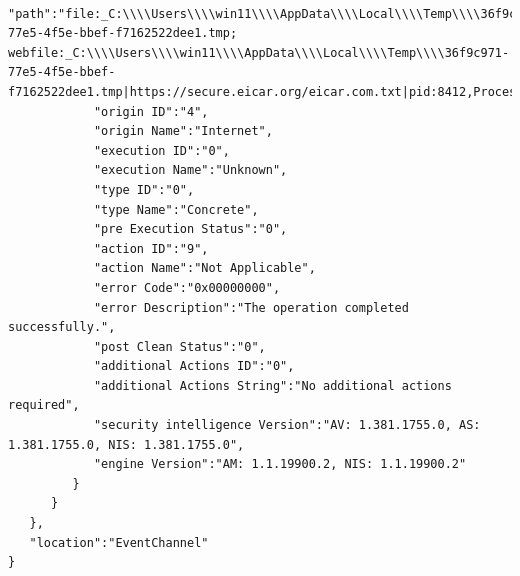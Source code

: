\begin{itemize}
\begin{verbatim}
            "path":"file:_C:\\\\Users\\\\win11\\\\AppData\\\\Local\\\\Temp\\\\36f9c971-77e5-4f5e-bbef-f7162522dee1.tmp; webfile:_C:\\\\Users\\\\win11\\\\AppData\\\\Local\\\\Temp\\\\36f9c971-77e5-4f5e-bbef-f7162522dee1.tmp|https://secure.eicar.org/eicar.com.txt|pid:8412,ProcessStart:133173854939240064",
            "origin ID":"4",
            "origin Name":"Internet",
            "execution ID":"0",
            "execution Name":"Unknown",
            "type ID":"0",
            "type Name":"Concrete",
            "pre Execution Status":"0",
            "action ID":"9",
            "action Name":"Not Applicable",
            "error Code":"0x00000000",
            "error Description":"The operation completed successfully.",
            "post Clean Status":"0",
            "additional Actions ID":"0",
            "additional Actions String":"No additional actions required",
            "security intelligence Version":"AV: 1.381.1755.0, AS: 1.381.1755.0, NIS: 1.381.1755.0",
            "engine Version":"AM: 1.1.19900.2, NIS: 1.1.19900.2"
         }
      }
   },
   "location":"EventChannel"
}
    \end{verbatim}


\end{itemize}
